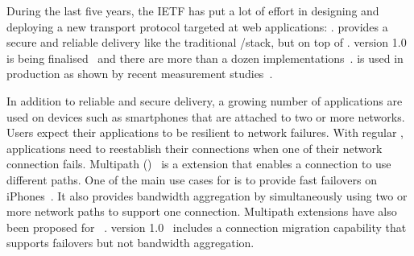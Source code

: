 During the last five years, the IETF has put a lot of effort
in designing and deploying a new transport protocol targeted at web
applications: \quic \cite{langley2017quic}. \quic provides a secure and
reliable delivery like the traditional \tls/\tcp stack, but on top of \udp.
\quic
version 1.0 is being finalised~\cite{draft-ietf-quic-transport} and there are
more than a dozen implementations~\cite{quicimplem,marx2020same}. \quic is used
in production as shown by recent measurement studies~\cite{trevisan2020five}.

In addition to reliable and secure delivery, a growing number of applications
are used on devices such as smartphones that are attached to two or more
networks. Users expect their applications to be resilient to network failures.
With regular \tcp, applications need to reestablish their connections when one
of their network connection fails. Multipath \tcp
(\mptcp)~\cite{rfc8684,raiciu2012hard} is a \tcp extension that enables a
connection to use different paths. One of the main use cases for \mptcp is to
provide fast failovers on iPhones~\cite{bonaventure2016multipath}. It also
provides bandwidth aggregation by simultaneously using two or more network paths
to support one connection. Multipath extensions have also been proposed for
\quic~\cite{viernickel2018multipath,de2017multipath}. \quic version
1.0~\cite{draft-ietf-quic-transport} includes a connection migration capability
that supports failovers but not bandwidth aggregation.

